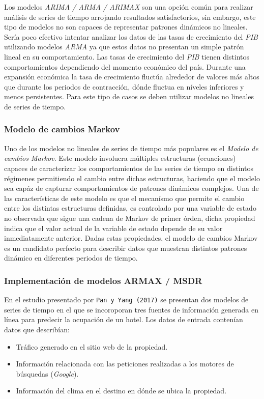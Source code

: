 {Los modelos \emph{ARIMA / ARMA / ARIMAX} son una opción común para realizar análisis de series de tiempo arrojando resultados satisfactorios, sin embargo, este tipo de modelos no son capaces de representar patrones dinámicos no lineales. Sería poco efectivo intentar analizar los datos de las tasas de crecimiento del \emph{PIB} utilizando modelos \emph{ARMA} ya que estos datos no presentan un simple patrón lineal en su comportamiento. Las tasas de crecimiento del \emph{PIB} tienen distintos comportamientos dependiendo del momento económico del país. Durante una expansión económica la tasa de crecimiento fluctúa alrededor de valores más altos que durante los periodos de contracción, dónde fluctua en níveles inferiores y menos persistentes. Para este tipo de casos se deben utilizar modelos no lineales de series de tiempo.

\subsubsection*{Modelo de cambios Markov}

Uno de los modelos no lineales de series de tiempo más populares es el \emph{Modelo de cambios Markov}. Este modelo involucra múltiples estructuras (ecuaciones) capaces de caracterizar los comportamientos de las series de tiempo en distintos régimenes permitiendo el cambio entre dichas estructuras, haciendo que el modelo sea capáz de capturar comportamientos de patrones dinámicos complejos. Una de las características de este modelo es que el mecanísmo que permite el cambio entre los distintas estructuras definidas, es controlado por una variable de estado no observada que sigue una cadena de Markov de primer órden, dicha propiedad indica que el valor actual de la variable de estado depende de su valor inmediatamente anterior. Dadas estas propiedades, el modelo de cambios Markov es un candidato perfecto para describir datos que muestran distintos patrones dinámico en diferentes periodos de tiempo.


\subsubsection*{Implementación de modelos ARMAX / MSDR}

En el estudio presentado por \texttt{Pan y Yang (2017)} se presentan dos modelos de series de tiempo en el que se incoroporan tres fuentes de información generada en línea para predecir la ocupación de un hotel. Los datos de entrada contenían datos que describían:
\begin{itemize}
  \item Tráfico generado en el sitio web de la propiedad.
  \item Información relacionada con las peticiones realizadas a los motores de búsquedas (\emph{Google}).
  \item Información del clima en el destino en dónde se ubica la propiedad.
\end{itemize}


}
